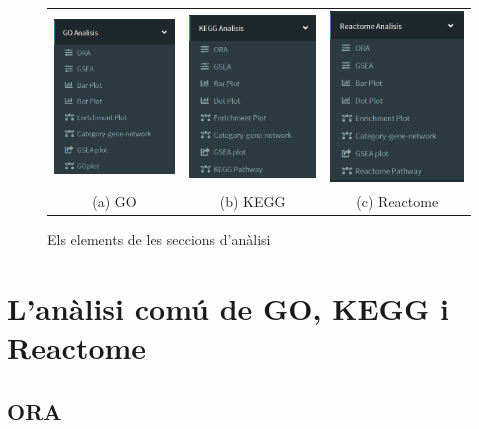 \documentclass[]{article}
\begin{document}
\begin{figure}[h!]
\centering
\begin{tabular}{ccc}
  \includegraphics[width=45mm]{App_F2_Items_GO.png} &   
  \includegraphics[width=45mm]{App_F3_Items_KEGG.png} &
  \includegraphics[width=45mm]{App_F4_Items_RA.png} \\
(a) GO & (b) KEGG & (c) Reactome \\
\end{tabular}
\caption{Els elements de les seccions d'anàlisi}
\end{figure}

\section{L'anàlisi comú de GO, KEGG i Reactome}

\subsection{ORA}
\end{document}

